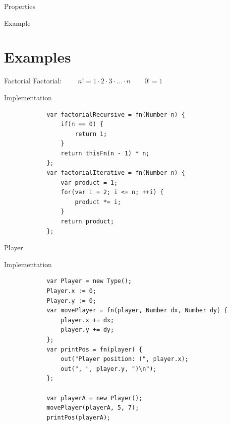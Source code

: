 \documentclass[ucs,9pt]{beamer}
\begin{document}
\begin{frame}[fragile]{Properties}
	\begin{block}{Example}
		
	\end{block}
\end{frame}

\section{Examples}
\begin{frame}[fragile]{Factorial}
	Factorial: $\qquad n! = 1 \cdot 2 \cdot 3 \cdot \ldots \cdot n \qquad 0! = 1$
	\begin{block}{Implementation}
		\begin{lstlisting}
			var factorialRecursive = fn(Number n) {
			    if(n == 0) {
			        return 1;
			    }
			    return thisFn(n - 1) * n;
			};
			var factorialIterative = fn(Number n) {
			    var product = 1;
			    for(var i = 2; i <= n; ++i) {
			        product *= i;
			    }
			    return product;
			};
		\end{lstlisting}
	\end{block}
\end{frame}

\begin{frame}[fragile]{Player}
	\begin{block}{Implementation}
		\begin{lstlisting}
			var Player = new Type();
			Player.x := 0;
			Player.y := 0;
			var movePlayer = fn(player, Number dx, Number dy) {
			    player.x += dx;
			    player.y += dy;
			};
			var printPos = fn(player) {
			    out("Player position: (", player.x);
			    out(", ", player.y, ")\n");
			};

			var playerA = new Player();
			movePlayer(playerA, 5, 7);
			printPos(playerA);
		\end{lstlisting}
	\end{block}
\end{frame}

\HNIlastframe
\end{document}
